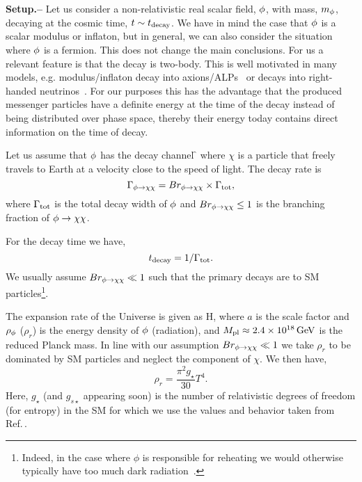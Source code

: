\documentclass[superscriptaddress,aps,preprintnumbers,amsmath,showpacs,amssymb,prd,nofootinbib,reprint]{revtex4-1}
\begin{document}
{\bf Setup.--}
Let us consider a non-relativistic real scalar field, $\phi$, with mass, $m_\phi$, decaying at the cosmic time, $t\sim t_{\rm decay}$. We have in mind the case that $\phi $ is a scalar modulus or inflaton, but in general, we can also consider the situation where $\phi$ is a fermion. This does not change the main conclusions. 
For us a relevant feature is that the decay is two-body. This is well motivated in many models, e.g. modulus/inflaton decay into axions/ALPs~ \cite{Cicoli:2012aq,Higaki:2012ar,Conlon:2013isa,Hebecker:2014gka} or decays into right-handed neutrinos~\cite{Lazarides:1991wu,Nakayama:2011ri,King:2017nbl, Antusch:2018zvu, Guth:2018hsa, Jaeckel:2020oet}.
For our purposes this has the advantage that the produced messenger particles have a definite energy at the time of the decay instead of being distributed over phase space, thereby their energy today contains direct information on the time of decay. 

Let us assume that $\phi$ has the decay channel 
\beq
\f \to \chi \chi 
\eeq
where $\chi$ is a particle that freely travels to Earth at a velocity close to the speed of light. 
The decay rate is 
\begin{equation}
  \Gamma_{\phi \to \chi\chi } = Br_{\phi \to \chi\chi } \times \Gamma_{\rm tot},  
\end{equation}
where $\Gamma_{\rm tot}$ is the total decay width of $\phi$ and $Br_{\phi \to \chi\chi } \leq 1$ is the branching fraction of $\phi \to \chi\chi$.

For the decay time we have,
\begin{equation}
   t_{\rm decay}=1/\Gamma_{\rm tot}. 
\end{equation} 
We usually assume $Br_{\phi \to \chi\chi } \ll 1 $ such that the {primary} decays are to SM particles\footnote{Indeed, in the case where $\phi$ is responsible for reheating we would otherwise typically have too much dark radiation~\cite{Aghanim:2018eyx,Fields:2019pfx}.}. 

The expansion rate of the Universe is given as 
\beq
{}
H\equiv {}\approx {},
\eeq
where $a$ is the scale factor and $\rho_\phi$ ($\rho_r$)  is the energy density of $\phi$ (radiation), and 
$M_{\rm pl}\approx 2.4\times 10^{18}{\rm \, GeV}$ is the reduced Planck mass.
In line with our assumption $Br_{\phi \to \chi\chi } \ll 1 $ we take $\rho_r$ to be dominated by SM particles and neglect the component of $\chi$. We then have, 
\begin{equation}
   \rho_r=\frac{\pi^2 g_\star }{30} T^4.
\end{equation} 
Here, $g_{\star}$ (and $g_{s\star}$ appearing soon) is the number of relativistic degrees of freedom (for entropy) in the SM for which we use the values and behavior taken from Ref.\,\cite{Husdal:2016haj}.   
\end{document}
